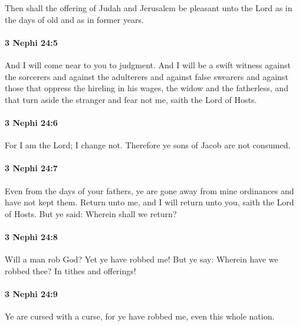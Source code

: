 			Then shall the offering of Judah and Jerusalem be pleasant unto the Lord
			as in the days of old and as in former years.

		\paragraph{3 Nephi 24:5} %
			\label{3NEPHI-24-5}

			And I will come near to you to judgment.
			And I will be a swift witness against the sorcerers
			and against the adulterers and against false swearers
			and against those that oppress the hireling in his wages,
			the widow and the fatherless,
			and that turn aside the stranger and fear not me,
			saith the Lord of Hosts.

		\paragraph{3 Nephi 24:6} %
			\label{3NEPHI-24-6}

			For I am the Lord; I change not.
			Therefore ye sons of Jacob are not consumed.

		\paragraph{3 Nephi 24:7} %
			\label{3NEPHI-24-7}

			Even from the days of your fathers,
			ye are gone away from mine ordinances and have not kept them.
			Return unto me, and I will return unto you, saith the Lord of Hosts.
			But ye said: Wherein shall we return?

		\paragraph{3 Nephi 24:8} %
			\label{3NEPHI-24-8}

			Will a man rob God? Yet ye have robbed me!
			But ye say: Wherein have we robbed thee?
			In tithes and offerings!

		\paragraph{3 Nephi 24:9} %
			\label{3NEPHI-24-9}

			Ye are cursed with a curse,
			for ye have robbed me, even this whole nation.

